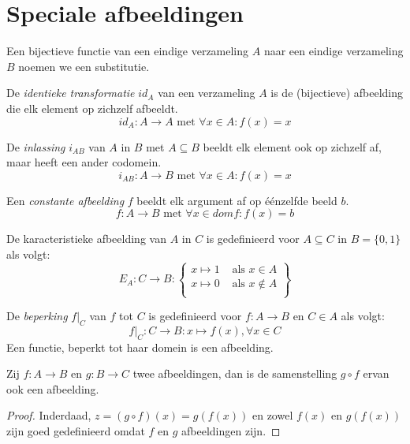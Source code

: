 \documentclass[main.tex]{subfiles}
\begin{document}
\section{Speciale afbeeldingen}
\label{sec:spec-afbe}

\begin{de}
  Een bijectieve functie van een eindige verzameling $A$ naar een eindige verzameling $B$ noemen we een substitutie. 
\end{de}

\begin{de}
  \label{identieke-transformatie}
  De \emph{identieke transformatie} $id_{A}$ van een verzameling $A$ is de (bijectieve) afbeelding die elk element op zichzelf afbeeldt.
  \[ id_{A}: A \rightarrow A \text{ met } \forall x \in A: f(x) = x \]
\end{de}

\begin{de}
  De \emph{inlassing} $i_{AB}$ van $A$ in $B$ met $A \subseteq B$ beeldt elk element ook op zichzelf af, maar heeft een ander codomein.
  \[ i_{AB}: A \rightarrow B \text{ met } \forall x \in A: f(x) = x \]
\end{de}

\begin{de}
  Een \emph{constante afbeelding} $f$ beeldt elk argument af op \'e\'enzelfde beeld $b$.
  \[ f: A \rightarrow B \text{ met } \forall x \in dom f: f(x) = b \]
\end{de}

\begin{de}
  De karacteristieke afbeelding van $A$ in $C$ is gedefinieerd voor $A \subseteq C$ in $B = \{0,1\}$ als volgt:
  \[
  E_{A}: C \rightarrow B:
  \left \lbrace
    \begin{array}{cc}
      x \mapsto 1 &\text{ als } x \in A\\
      x \mapsto 0 &\text{ als } x \not\in A\\
    \end{array}
  \right \rbrace
  \]
\end{de}

\begin{de}
  De \emph{beperking} $f|_{C}$ van $f$ tot $C$ is gedefinieerd voor $f: A \rightarrow B$ en $C \in A$ als volgt:
  \[ f|_{C}: C \rightarrow B: x \mapsto f(x), \forall x \in C\]
  Een functie, beperkt tot haar domein is een afbeelding.
\end{de}

\begin{st}
  Zij $f: A \rightarrow B$ en $g: B \rightarrow C$ twee afbeeldingen, dan is de samenstelling $g \circ f$ ervan ook een afbeelding.

  \begin{proof}
    Inderdaad, $z = (g \circ f)(x) = g(f(x))$ en zowel $f(x)$ en $g(f(x))$ zijn goed gedefinieerd omdat $f$ en $g$ afbeeldingen zijn. 
  \end{proof}
\end{st}
\end{document}
